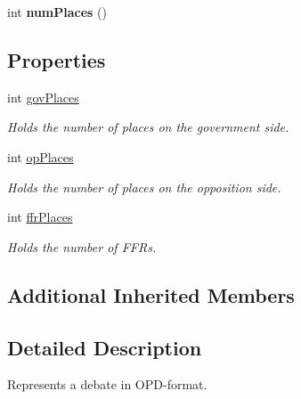 \begin{DoxyCompactItemize}
\item 
\hypertarget{classOPDebate_aed14a9f7d9019fe304af5811c28592e0}{int {\bfseries num\-Places} ()}\label{classOPDebate_aed14a9f7d9019fe304af5811c28592e0}

\end{DoxyCompactItemize}
\subsection*{Properties}
\begin{DoxyCompactItemize}
\item 
\hypertarget{classOPDebate_ab84df4cd7885bff2c1aba90cebfe2b16}{int \hyperlink{classOPDebate_ab84df4cd7885bff2c1aba90cebfe2b16}{gov\-Places}}\label{classOPDebate_ab84df4cd7885bff2c1aba90cebfe2b16}

\begin{DoxyCompactList}\small\item\em Holds the number of places on the government side. \end{DoxyCompactList}\item 
\hypertarget{classOPDebate_ab957581d6e4ca6769ef88095f8245b70}{int \hyperlink{classOPDebate_ab957581d6e4ca6769ef88095f8245b70}{op\-Places}}\label{classOPDebate_ab957581d6e4ca6769ef88095f8245b70}

\begin{DoxyCompactList}\small\item\em Holds the number of places on the opposition side. \end{DoxyCompactList}\item 
\hypertarget{classOPDebate_a9c1bc648302a8c503fc8cc4893a1ac26}{int \hyperlink{classOPDebate_a9c1bc648302a8c503fc8cc4893a1ac26}{ffr\-Places}}\label{classOPDebate_a9c1bc648302a8c503fc8cc4893a1ac26}

\begin{DoxyCompactList}\small\item\em Holds the number of F\-F\-Rs. \end{DoxyCompactList}\end{DoxyCompactItemize}
\subsection*{Additional Inherited Members}


\subsection{Detailed Description}
Represents a debate in O\-P\-D-\/format. 

